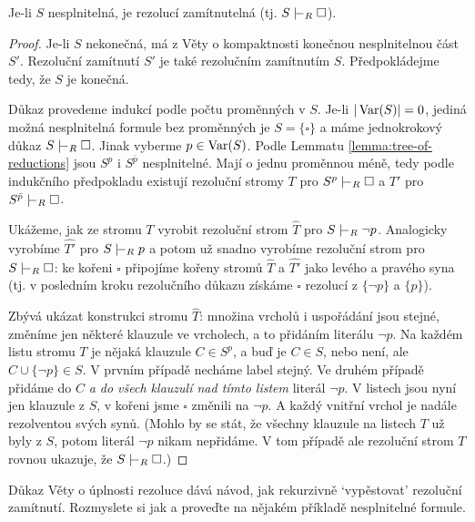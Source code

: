 \begin{theorem}
Je-li $S$ nesplnitelná, je rezolucí zamítnutelná (tj. $S\proves_R\square$).
\end{theorem}   
\begin{proof}
Je-li $S$ nekonečná, má z Věty o kompaktnosti konečnou nesplnitelnou část $S'$. Rezoluční zamítnutí $S'$ je také rezolučním zamítnutím $S$. Předpokládejme tedy, že $S$ je konečná. 

Důkaz provedeme indukcí podle počtu proměnných v $S$. Je-li $|\operatorname{Var}(S)|=0$, jediná možná nesplnitelná formule bez proměnných je $S=\{\square\}$ a máme jednokrokový důkaz $S\proves_R\square$. Jinak vyberme $p\in\operatorname{Var}(S)$. Podle Lemmatu \ref{lemma:tree-of-reductions} jsou $S^p$ i $S^{\bar p}$ nesplnitelné. Mají o jednu proměnnou méně, tedy podle indukčního předpokladu existují rezoluční stromy $T$ pro $S^p\proves_R\square$ a $T'$ pro $S^{\bar p}\proves_R\square$.

Ukážeme, jak ze stromu $T$ vyrobit rezoluční strom $\widehat T$ pro $S\proves_R \neg p$. Analogicky vyrobíme $\widehat{T'}$ pro $S\proves_R p$ a potom už snadno vyrobíme rezoluční strom pro $S\proves_R\square$: ke kořeni $\square$ připojíme kořeny stromů $\widehat T$ a $\widehat{T'}$ jako levého a pravého syna (tj. v posledním kroku rezolučního důkazu získáme $\square$ rezolucí z $\{\neg p\}$ a $\{p\}$).

Zbývá ukázat konstrukci stromu $\widehat T$: množina vrcholů i uspořádání jsou stejné, změníme jen některé klauzule ve vrcholech, a to přidáním literálu $\neg p$. Na každém listu stromu $T$ je nějaká klauzule $C\in S^p$, a buď je $C\in S$, nebo není, ale $C\cup\{\neg p\}\in S$. V prvním případě necháme label stejný. Ve druhém případě přidáme do $C$ \emph{a do všech klauzulí nad tímto listem} literál $\neg p$. V listech jsou nyní jen klauzule z $S$, v kořeni jsme $\square$ změnili na $\neg p$. A každý vnitřní vrchol je nadále rezolventou svých synů. (Mohlo by se stát, že všechny klauzule na listech $T$ už byly z $S$, potom literál $\neg p$ nikam nepřidáme. V tom případě ale rezoluční strom $T$ rovnou ukazuje, že $S\proves_R \square$.)
\end{proof}

\begin{exercise}
    Důkaz Věty o úplnosti rezoluce dává návod, jak rekurzivně `vypěstovat' rezoluční zamítnutí. Rozmyslete si jak a proveďte na nějakém příkladě nesplnitelné formule.
\end{exercise} %


